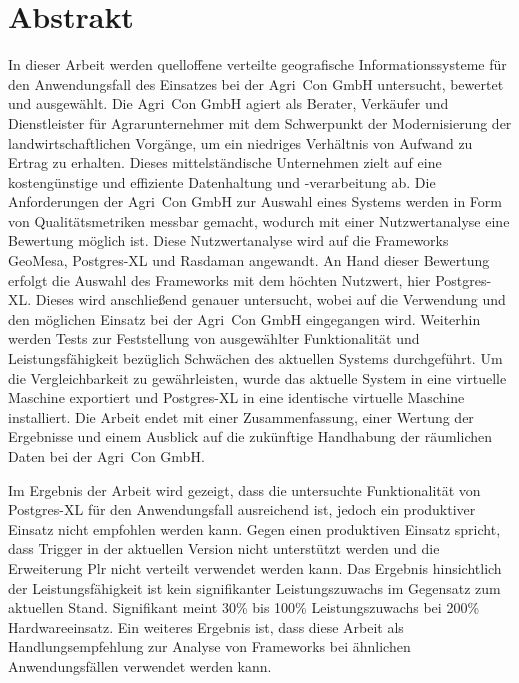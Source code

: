 
\chapter*{Abstrakt}
\label{sec:Abstrakt}
In dieser Arbeit werden quelloffene verteilte geografische Informationssysteme für den Anwendungsfall des Einsatzes bei der Agri~Con GmbH untersucht, bewertet und ausgewählt.
Die Agri~Con GmbH agiert als Berater, Verkäufer und Dienstleister für Agrarunternehmer mit dem Schwerpunkt der Modernisierung der landwirtschaftlichen Vorgänge, um ein niedriges Verhältnis von Aufwand zu Ertrag zu erhalten.
Dieses mittelständische Unternehmen zielt auf eine kostengünstige und effiziente Datenhaltung und -verarbeitung ab.
Die Anforderungen der Agri~Con GmbH zur Auswahl eines Systems werden in Form von Qualitätsmetriken messbar gemacht, wodurch mit einer Nutzwertanalyse eine Bewertung möglich ist.
Diese Nutzwertanalyse wird auf die Frameworks GeoMesa, Postgres-XL und Rasdaman angewandt.
An Hand dieser Bewertung erfolgt die Auswahl des Frameworks mit dem höchten Nutzwert, hier Postgres-XL.
Dieses wird anschließend genauer untersucht, wobei auf die Verwendung und den möglichen Einsatz bei der Agri~Con GmbH eingegangen wird.
Weiterhin werden Tests zur Feststellung von ausgewählter Funktionalität und Leistungsfähigkeit bezüglich Schwächen des aktuellen Systems durchgeführt.
Um die Vergleichbarkeit zu gewährleisten, wurde das aktuelle System in eine virtuelle Maschine exportiert und Postgres-XL in eine identische virtuelle Maschine installiert.
Die Arbeit endet mit einer Zusammenfassung, einer Wertung der Ergebnisse und einem Ausblick auf die zukünftige Handhabung der räumlichen Daten bei der Agri~Con GmbH.

Im Ergebnis der Arbeit wird gezeigt, dass die untersuchte Funktionalität von Postgres-XL für den Anwendungsfall ausreichend ist, jedoch ein produktiver Einsatz nicht empfohlen werden kann.
Gegen einen produktiven Einsatz spricht, dass Trigger in der aktuellen Version nicht unterstützt werden und die Erweiterung Plr nicht verteilt verwendet werden kann.
Das Ergebnis hinsichtlich der Leistungsfähigkeit ist kein signifikanter Leistungszuwachs im Gegensatz zum aktuellen Stand.
Signifikant meint 30\%{} bis 100\%{} Leistungszuwachs bei 200\%{} Hardwareeinsatz.
Ein weiteres Ergebnis ist, dass diese Arbeit als Handlungsempfehlung zur Analyse von Frameworks bei ähnlichen Anwendungsfällen verwendet werden kann.